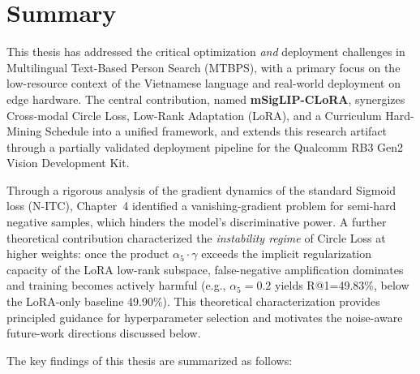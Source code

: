 \documentclass[../main.tex]{subfiles}
\begin{document}
\section{Summary}

\noindent This thesis has addressed the critical optimization \textit{and} deployment challenges in Multilingual Text-Based Person Search (MTBPS), with a primary focus on the low-resource context of the Vietnamese language and real-world deployment on edge hardware. The central contribution, named \textbf{mSigLIP-CLoRA}, synergizes Cross-modal Circle Loss, Low-Rank Adaptation (LoRA), and a Curriculum Hard-Mining Schedule into a unified framework, and extends this research artifact through a partially validated deployment pipeline for the Qualcomm RB3 Gen2 Vision Development Kit.

\noindent Through a rigorous analysis of the gradient dynamics of the standard Sigmoid loss (N-ITC), Chapter~4 identified a vanishing-gradient problem for semi-hard negative samples, which hinders the model's discriminative power. A further theoretical contribution characterized the \textit{instability regime} of Circle Loss at higher weights: once the product $\alpha_5 \cdot \gamma$ exceeds the implicit regularization capacity of the LoRA low-rank subspace, false-negative amplification dominates and training becomes actively harmful (e.g., $\alpha_5{=}0.2$ yields R@1=49.83\%, below the LoRA-only baseline 49.90\%). This theoretical characterization provides principled guidance for hyperparameter selection and motivates the noise-aware future-work directions discussed below.

\noindent The key findings of this thesis are summarized as follows:
\end{document}
